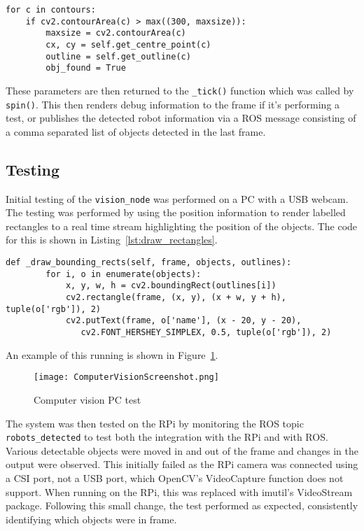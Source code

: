 \begin{lstlisting}[caption={Contour teration in \texttt{search()}}, label={lst:cv_search_loop}]
for c in contours:
    if cv2.contourArea(c) > max((300, maxsize)):
        maxsize = cv2.contourArea(c)
        cx, cy = self.get_centre_point(c)
        outline = self.get_outline(c)
        obj_found = True
\end{lstlisting}

These parameters are then returned to the \verb|_tick()| function which was called by
\verb|spin()|. This then renders debug information to the frame if it's performing a test, or
publishes the detected robot information via a ROS message consisting of a comma separated list of
objects detected in the last frame.

\subsection{Testing}\label{soft/cv/test}
Initial testing of the \verb|vision_node| was performed on a PC with a USB webcam. The
testing was performed by using the position information to render labelled rectangles to a real
time stream highlighting the position of the objects. The code for this is shown in Listing~\ref{lst:draw_rectangles}.

\begin{lstlisting}[caption={Object highlighting code}, label={lst:draw_rectangles}]
    def _draw_bounding_rects(self, frame, objects, outlines):
        for i, o in enumerate(objects):
            x, y, w, h = cv2.boundingRect(outlines[i])
            cv2.rectangle(frame, (x, y), (x + w, y + h), tuple(o['rgb']), 2)
            cv2.putText(frame, o['name'], (x - 20, y - 20),
			   cv2.FONT_HERSHEY_SIMPLEX, 0.5, tuple(o['rgb']), 2)
\end{lstlisting}


\noindent
An example of this running is shown in Figure~\ref{fig:cv_screenshot}.

\begin{figure}[!ht]
	\centering
	\texttt{[image: ComputerVisionScreenshot.png]}
	\caption{Computer vision PC test}\label{fig:cv_screenshot}
\end{figure}

The system was then tested on the RPi by monitoring the ROS topic \verb|robots_detected| to
test both the integration with the RPi and with ROS. Various detectable objects were moved in
and out of the frame and changes in the output were observed. This initially failed as the RPi
camera was connected using a CSI port, not a USB port, which OpenCV's VideoCapture function
does not support. When running on the RPi, this was replaced with imutil's VideoStream package.
Following this small change, the test performed as expected, consistently identifying which
objects were in frame.

